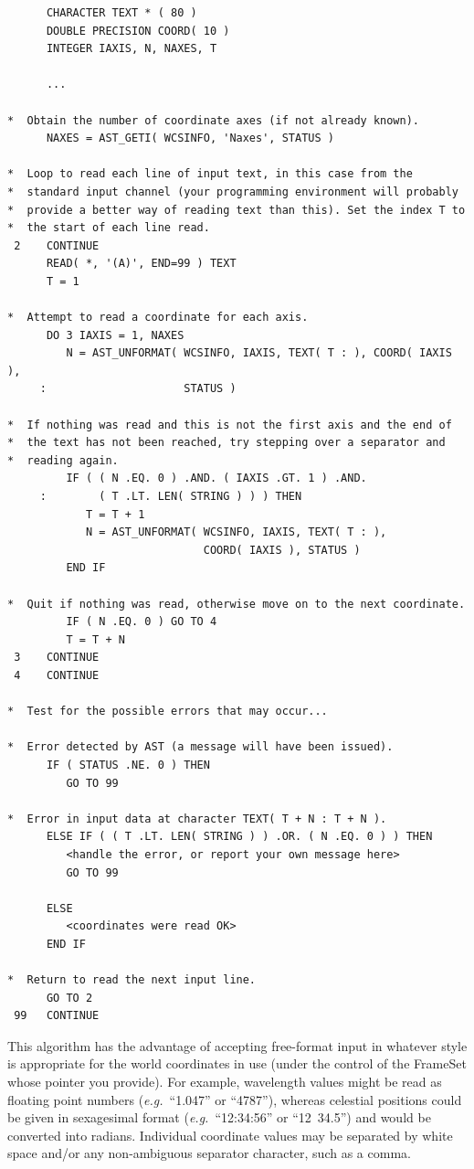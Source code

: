 \documentclass[twoside,11pt]{article}
\begin{document}
\small
\begin{verbatim}
      CHARACTER TEXT * ( 80 )
      DOUBLE PRECISION COORD( 10 )
      INTEGER IAXIS, N, NAXES, T

      ...

*  Obtain the number of coordinate axes (if not already known).
      NAXES = AST_GETI( WCSINFO, 'Naxes', STATUS )

*  Loop to read each line of input text, in this case from the
*  standard input channel (your programming environment will probably
*  provide a better way of reading text than this). Set the index T to
*  the start of each line read.
 2    CONTINUE
      READ( *, '(A)', END=99 ) TEXT
      T = 1

*  Attempt to read a coordinate for each axis.
      DO 3 IAXIS = 1, NAXES
         N = AST_UNFORMAT( WCSINFO, IAXIS, TEXT( T : ), COORD( IAXIS ),
     :                     STATUS )

*  If nothing was read and this is not the first axis and the end of
*  the text has not been reached, try stepping over a separator and
*  reading again.
         IF ( ( N .EQ. 0 ) .AND. ( IAXIS .GT. 1 ) .AND.
     :        ( T .LT. LEN( STRING ) ) ) THEN
            T = T + 1
            N = AST_UNFORMAT( WCSINFO, IAXIS, TEXT( T : ),
                              COORD( IAXIS ), STATUS )
         END IF

*  Quit if nothing was read, otherwise move on to the next coordinate.
         IF ( N .EQ. 0 ) GO TO 4
         T = T + N
 3    CONTINUE
 4    CONTINUE

*  Test for the possible errors that may occur...

*  Error detected by AST (a message will have been issued).
      IF ( STATUS .NE. 0 ) THEN
         GO TO 99

*  Error in input data at character TEXT( T + N : T + N ).
      ELSE IF ( ( T .LT. LEN( STRING ) ) .OR. ( N .EQ. 0 ) ) THEN
         <handle the error, or report your own message here>
         GO TO 99

      ELSE
         <coordinates were read OK>
      END IF

*  Return to read the next input line.
      GO TO 2
 99   CONTINUE
\end{verbatim}
\normalsize

This algorithm has the advantage of accepting free-format input in
whatever style is appropriate for the world coordinates in use (under
the control of the FrameSet whose pointer you provide). For example,
wavelength values might be read as floating point numbers
({\em{e.g.}}\ ``1.047'' or ``4787''), whereas celestial positions
could be given in sexagesimal format ({\em{e.g.}}\ ``12:34:56'' or
``12~34.5'') and would be converted into radians. Individual
coordinate values may be separated by white space and/or any
non-ambiguous separator character, such as a comma.
\end{document}
